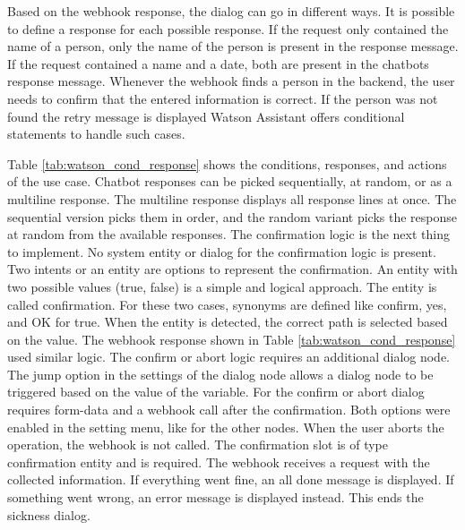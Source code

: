 Based on the webhook response, the dialog can go in different ways.
It is possible to define a response for each possible response.
If the request only contained the name of a person, only the name of the person is present in the response message.
If the request contained a name and a date, both are present in the chatbots response message.
Whenever the webhook finds a person in the backend, the user needs to confirm that the entered information is correct.
If the person was not found the retry message is displayed
Watson Assistant offers conditional statements to handle such cases.

Table \ref{tab:watson_cond_response} shows the conditions, responses, and actions of the use case.
Chatbot responses can be picked sequentially, at random, or as a multiline response.
The multiline response displays all response lines at once.
The sequential version picks them in order, and the random variant picks the response at random from the available responses.
The confirmation logic is the next thing to implement.
No system entity or dialog for the confirmation logic is present.
Two intents or an entity are options to represent the confirmation.
An entity with two possible values (true, false) is a simple and logical approach.
The entity is called confirmation.
For these two cases, synonyms are defined like confirm, yes, and OK for true.
When the entity is detected, the correct path is selected based on the value.
The webhook response shown in Table \ref{tab:watson_cond_response} used similar logic.
The confirm or abort logic requires an additional dialog node.
The jump option in the settings of the dialog node allows a dialog node to be triggered based on the value of the variable.
For the confirm or abort dialog requires form-data and a webhook call after the confirmation.
Both options were enabled in the setting menu, like for the other nodes.
When the user aborts the operation, the webhook is not called.
The confirmation slot is of type confirmation entity and is required.
The webhook receives a request with the collected information.
If everything went fine, an all done message is displayed.
If something went wrong, an error message is displayed instead.
This ends the sickness dialog.

